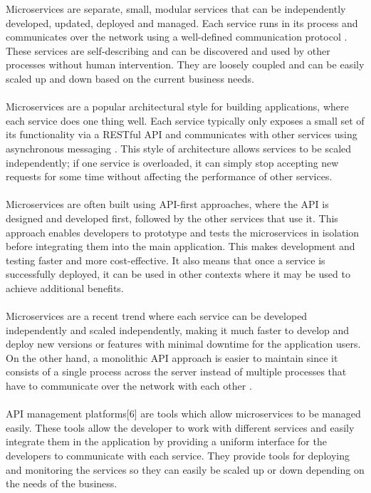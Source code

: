\documentclass[BIF,Master,nenglish]{twbook}%
\begin{document}
\noindent
Microservices are separate, small, modular services that can be independently developed, updated, deployed and managed. Each service runs in its process and communicates over the network using a well-defined communication protocol \cite{fow2014}. These services are self-describing and can be discovered and used by other processes without human intervention. They are loosely coupled and can be easily scaled up and down based on the current business needs.
\\
\\
Microservices are a popular architectural style for building applications, where each service does one thing well. Each service typically only exposes a small set of its functionality via a RESTful API and communicates with other services using asynchronous messaging \cite{gooMes}. This style of architecture allows services to be scaled independently; if one service is overloaded, it can simply stop accepting new requests for some time without affecting the performance of other services.
\\
\\
Microservices are often built using API-first approaches, where the API is designed and developed first, followed by the other services that use it. This approach enables developers to prototype and tests the microservices in isolation before integrating them into the main application. This makes development and testing faster and more cost-effective. It also means that once a service is successfully deployed, it can be used in other contexts where it may be used to achieve additional benefits.
\\
\\
Microservices are a recent trend where each service can be developed independently and scaled independently, making it much faster to develop and deploy new versions or features with minimal downtime for the application users. On the other hand, a monolithic API approach is easier to maintain since it consists of a single process across the server instead of multiple processes that have to communicate over the network with each other \cite{pat2021}.
\\
\\
API management platforms[6] are tools which allow microservices to be managed easily. These tools allow the developer to work with different services and easily integrate them in the application by providing a uniform interface for the developers to communicate with each service. They provide tools for deploying and monitoring the services so they can easily be scaled up or down depending on the needs of the business.
\end{document}
